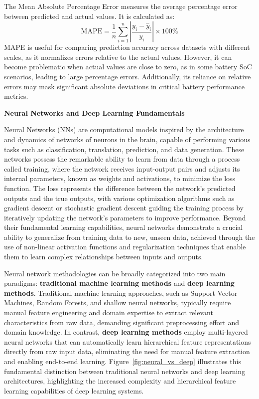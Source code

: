 The Mean Absolute Percentage Error measures the average percentage error between predicted and actual values. It is calculated as:
\begin{equation}
\text{MAPE} = \frac{1}{n} \sum_{i=1}^{n} \left| \frac{y_i - \hat{y}_i}{y_i} \right| \times 100\%
\end{equation}
MAPE is useful for comparing prediction accuracy across datasets with different scales, as it normalizes errors relative to the actual values. However, it can become problematic when actual values are close to zero, as in some battery SoC scenarios, leading to large percentage errors. Additionally, its reliance on relative errors may mask significant absolute deviations in critical battery performance metrics.

\textbf{Neural Networks and Deep Learning Fundamentals}

Neural Networks (NNs) are computational models inspired by the architecture and dynamics of networks of neurons in the brain, capable of performing various tasks such as classification, translation, prediction, and data generation. These networks possess the remarkable ability to learn from data through a process called training, where the network receives input-output pairs and adjusts its internal parameters, known as weights and activations, to minimize the loss function. The loss represents the difference between the network's predicted outputs and the true outputs, with various optimization algorithms such as gradient descent or stochastic gradient descent guiding the training process by iteratively updating the network's parameters to improve performance. Beyond their fundamental learning capabilities, neural networks demonstrate a crucial ability to generalize from training data to new, unseen data, achieved through the use of non-linear activation functions and regularization techniques that enable them to learn complex relationships between inputs and outputs.

Neural network methodologies can be broadly categorized into two main paradigms: \textbf{traditional machine learning methods} and \textbf{deep learning methods}. Traditional machine learning approaches, such as Support Vector Machines, Random Forests, and shallow neural networks, typically require manual feature engineering and domain expertise to extract relevant characteristics from raw data, demanding significant preprocessing effort and domain knowledge. In contrast, \textbf{deep learning methods} employ multi-layered neural networks that can automatically learn hierarchical feature representations directly from raw input data, eliminating the need for manual feature extraction and enabling end-to-end learning. Figure~\ref{fig:neural_vs_deep} illustrates this fundamental distinction between traditional neural networks and deep learning architectures, highlighting the increased complexity and hierarchical feature learning capabilities of deep learning systems.

